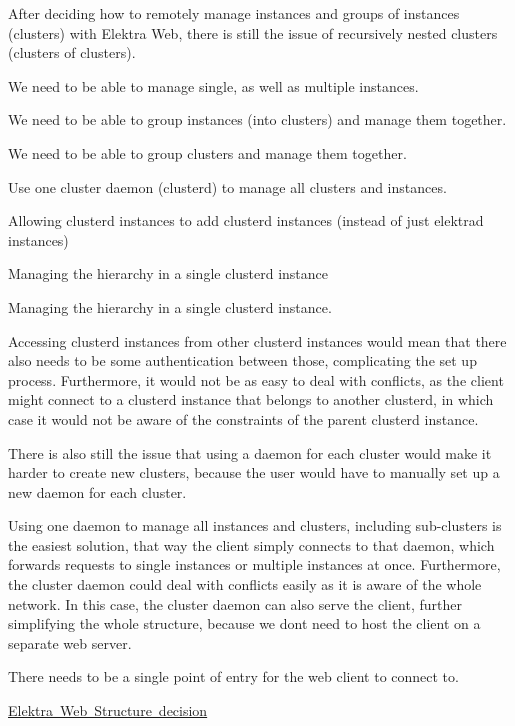 After deciding how to remotely manage instances and groups of instances (clusters) with Elektra Web, there is still the issue of recursively nested clusters (clusters of clusters).


\begin{DoxyItemize}
\item We need to be able to manage single, as well as multiple instances.
\item We need to be able to group instances (into clusters) and manage them together.
\item We need to be able to group clusters and manage them together.
\end{DoxyItemize}


\begin{DoxyItemize}
\item Use one cluster daemon (clusterd) to manage all clusters and instances.
\end{DoxyItemize}


\begin{DoxyItemize}
\item Allowing clusterd instances to add clusterd instances (instead of just elektrad instances)
\item Managing the hierarchy in a single clusterd instance
\end{DoxyItemize}

Managing the hierarchy in a single clusterd instance.

Accessing clusterd instances from other clusterd instances would mean that there also needs to be some authentication between those, complicating the set up process. Furthermore, it would not be as easy to deal with conflicts, as the client might connect to a clusterd instance that belongs to another clusterd, in which case it would not be aware of the constraints of the parent clusterd instance.

There is also still the issue that using a daemon for each cluster would make it harder to create new clusters, because the user would have to manually set up a new daemon for each cluster.

Using one daemon to manage all instances and clusters, including sub-\/clusters is the easiest solution, that way the client simply connects to that daemon, which forwards requests to single instances or multiple instances at once. Furthermore, the cluster daemon could deal with conflicts easily as it is aware of the whole network. In this case, the cluster daemon can also serve the client, further simplifying the whole structure, because we don\textquotesingle{}t need to host the client on a separate web server.


\begin{DoxyItemize}
\item There needs to be a single point of entry for the web client to connect to.
\end{DoxyItemize}


\begin{DoxyItemize}
\item \mbox{\hyperlink{doc_decisions_elektra_web_md}{Elektra Web Structure decision}}
\end{DoxyItemize}